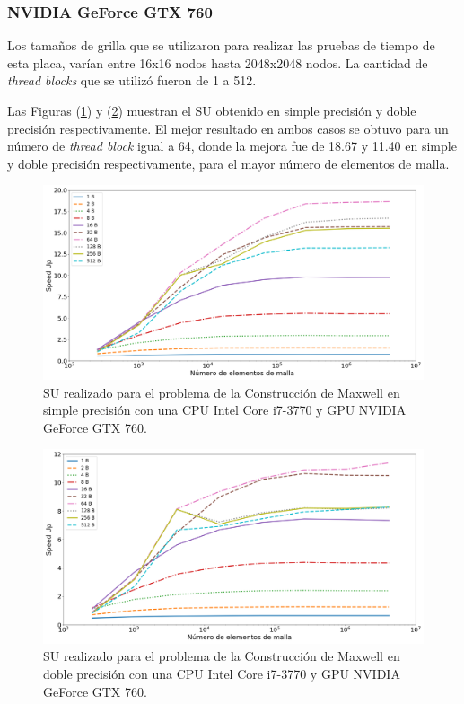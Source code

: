 \subsubsection{NVIDIA GeForce GTX 760}

Los tamaños de grilla que se utilizaron para realizar las pruebas de tiempo de esta placa, varían entre 16x16 nodos hasta 2048x2048 nodos. La cantidad de \textit{thread blocks} que se utilizó fueron de 1 a 512.

Las Figuras (\ref{fig:s_760_MxC_simple_1.0}) y (\ref{fig:s_760_MxC_double_1.0}) muestran el SU obtenido en simple precisión y doble precisión respectivamente. El mejor resultado en ambos casos se obtuvo para un número de \textit{thread block} igual a 64, donde la mejora fue de 18.67 y 11.40 en simple y doble precisión respectivamente, para el mayor número de elementos de malla.


\begin{figure}[htbp]
	\centering
	\includegraphics[width=\textwidth]{figs/cap4/s_760_MxC_simple_10}
	\caption{SU realizado para el problema de la Construcción de Maxwell en simple precisión con una CPU Intel Core i7-3770 y GPU NVIDIA GeForce GTX 760.} 
	\label{fig:s_760_MxC_simple_1.0}	
\end{figure}

\begin{figure}[htbp]
	\centering
	\includegraphics[width=\textwidth]{figs/cap4/s_760_MxC_double_10}
	\caption{SU realizado para el problema de la Construcción de Maxwell en doble precisión con una CPU Intel Core i7-3770 y GPU NVIDIA GeForce GTX 760.} 
	\label{fig:s_760_MxC_double_1.0}	
\end{figure}

